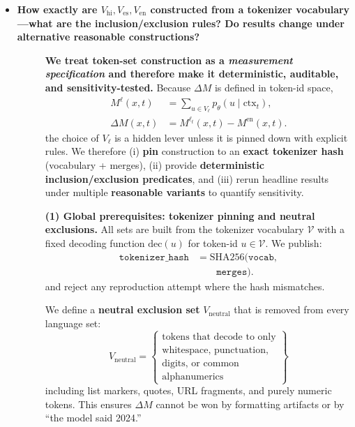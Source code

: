 \begin{itemize}[leftmargin=1.5em]


\item[\ding{93}] \textbf{How exactly are $V_{\mathrm{hi}},V_{\mathrm{es}},V_{\mathrm{en}}$ constructed from a tokenizer vocabulary---what are the inclusion/exclusion rules? Do results change under alternative reasonable constructions?}
\begin{description}
\item[] \textbf{We treat token-set construction as a \emph{measurement specification} and therefore make it \textbf{deterministic}, \textbf{auditable}, and \textbf{sensitivity-tested}.}
Because $\Delta M$ is defined in token-id space,
\[
\begin{aligned}
M^{\ell}(x,t) &= \sum_{u\in V_{\ell}}p_\theta(u\mid \mathrm{ctx}_t),\\
\Delta M(x,t) &= M^{\ell_t}(x,t)-M^{\mathrm{en}}(x,t).
\end{aligned}
\]
the choice of $V_\ell$ is a hidden lever unless it is pinned down with explicit rules. We therefore (i) \textbf{pin} construction to an \textbf{exact tokenizer hash} (vocabulary + merges), (ii) provide \textbf{deterministic inclusion/exclusion predicates}, and (iii) rerun headline results under multiple \textbf{reasonable variants} to quantify sensitivity.

\vspace{6pt}
\textbf{(1) Global prerequisites: tokenizer pinning and neutral exclusions.}
All sets are built from the tokenizer vocabulary $\mathcal{V}$ with a fixed decoding function $\mathrm{dec}(u)$ for token-id $u\in\mathcal{V}$. We publish:
\[
\begin{aligned}
\texttt{tokenizer\_hash}
&= \mathrm{SHA256}\big(\texttt{vocab}, \\
&\qquad \texttt{merges}\big).
\end{aligned}
\]
and reject any reproduction attempt where the hash mismatches.

We define a \textbf{neutral exclusion set} $V_{\mathrm{neutral}}$ that is removed from every language set:
\[
V_{\mathrm{neutral}}=
\left\{
\begin{aligned}
\text{tokens that decode to only}\\
\text{whitespace, punctuation,}\\
\text{digits, or common}\\
\text{alphanumerics}
\end{aligned}
\right\}
\]
including list markers, quotes, URL fragments, and purely numeric tokens. This ensures $\Delta M$ cannot be won by formatting artifacts or by “the model said 2024.”


\end{description}
\end{itemize}
